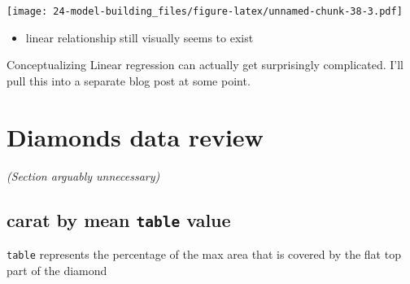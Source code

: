 \documentclass[]{book}
\newenvironment{Shaded}{\begin{snugshade}}{\end{snugshade}}
\newcommand{\DataTypeTok}[1]{\textcolor[rgb]{0.13,0.29,0.53}{#1}}
\newcommand{\DecValTok}[1]{\textcolor[rgb]{0.00,0.00,0.81}{#1}}
\newcommand{\KeywordTok}[1]{\textcolor[rgb]{0.13,0.29,0.53}{\textbf{#1}}}
\newcommand{\NormalTok}[1]{#1}
\newcommand{\OperatorTok}[1]{\textcolor[rgb]{0.81,0.36,0.00}{\textbf{#1}}}
\newcommand{\StringTok}[1]{\textcolor[rgb]{0.31,0.60,0.02}{#1}}
\providecommand{\tightlist}{%
  \setlength{\itemsep}{0pt}\setlength{\parskip}{0pt}}
\theoremstyle{definition}
\theoremstyle{definition}
\theoremstyle{definition}
\theoremstyle{remark}
\begin{document}
\texttt{[image: 24-model-building\_files/figure-latex/unnamed-chunk-38-3.pdf]}

\begin{itemize}
\tightlist
\item
  linear relationship still visually seems to exist
\end{itemize}

Conceptualizing Linear regression can actually get surprisingly
complicated. I'll pull this into a separate blog post at some point.

\hypertarget{diamonds-data-review}{%
\section{Diamonds data review}\label{diamonds-data-review}}

\emph{(Section arguably unnecessary)}

\hypertarget{carat-by-mean-table-value}{%
\subsection{\texorpdfstring{carat by mean \texttt{table}
value}{carat by mean table value}}\label{carat-by-mean-table-value}}

\texttt{table} represents the percentage of the max area that is covered
by the flat top part of the diamond

\begin{Shaded}
\end{Shaded}
\end{document}
